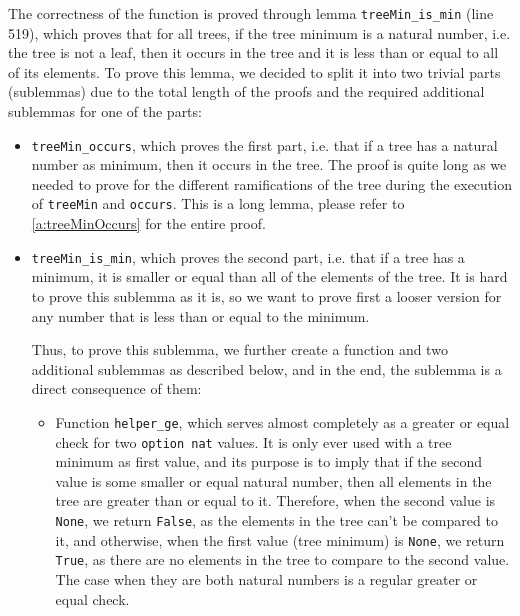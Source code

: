 \documentclass[a4paper]{article}
\begin{document}


The correctness of the function is proved through lemma \texttt{treeMin\_is\_min} (line 519), which proves that for all trees, if the tree minimum is a natural number, i.e. the tree is not a leaf, then it occurs in the tree and it is less than or equal to all of its elements. To prove this lemma, we decided to split it into two trivial parts (sublemmas) due to the total length of the proofs and the required additional sublemmas for one of the parts:

\begin{itemize}
    \item \texttt{treeMin\_occurs}, which proves the first part, i.e. that if a tree has a natural number as minimum, then it occurs in the tree. The proof is quite long as we needed to prove for the different ramifications of the tree during the execution of \texttt{treeMin} and \texttt{occurs}. This is a long lemma, please refer to \autoref{a:treeMinOccurs} for the entire proof.
    
    
    
    \item \texttt{treeMin\_is\_min}, which proves the second part, i.e. that if a tree has a minimum, it is smaller or equal than all of the elements of the tree. It is hard to prove this sublemma as it is, so we want to prove first a looser version for any number that is less than or equal to the minimum.
    
    
    
    Thus, to prove this sublemma, we further create a function and two additional sublemmas as described below, and in the end, the sublemma is a direct consequence of them:
    \begin{itemize}
        \item Function \texttt{helper\_ge}, which serves almost completely as a greater or equal check for two \texttt{option nat} values. It is only ever used with a tree minimum as first value, and its purpose is to imply that if the second value is some smaller or equal natural number, then all elements in the tree are greater than or equal to it. Therefore, when the second value is \texttt{None}, we return \texttt{False}, as the elements in the tree can't be compared to it, and otherwise, when the first value (tree minimum) is \texttt{None}, we return \texttt{True}, as there are no elements in the tree to compare to the second value. The case when they are both natural numbers is a regular greater or equal check.
        
        

\end{itemize}
\end{itemize}
\end{document}
